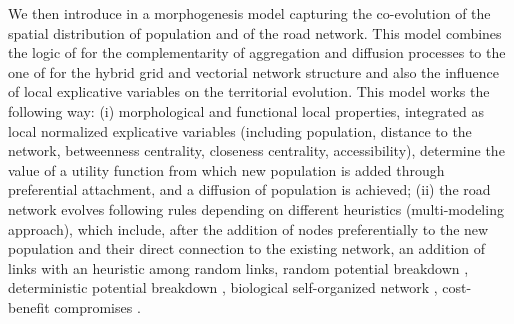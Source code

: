 \documentclass[11pt]{article}
\begin{document}
We then introduce in \cite{raimbault2018urban} a morphogenesis model capturing the co-evolution of the spatial distribution of population and of the road network. This model combines the logic of \cite{raimbault2018calibration} for the complementarity of aggregation and diffusion processes to the one of \cite{raimbault2014hybrid} for the hybrid grid and vectorial network structure and also the influence of local explicative variables on the territorial evolution. This model works the following way: (i) morphological and functional local properties, integrated as local normalized explicative variables (including population, distance to the network, betweenness centrality, closeness centrality, accessibility), determine the value of a utility function from which new population is added through preferential attachment, and a diffusion of population is achieved; (ii) the road network evolves following rules depending on different heuristics (multi-modeling approach), which include, after the addition of nodes preferentially to the new population and their direct connection to the existing network, an addition of links with an heuristic among random links, random potential breakdown \citep{schmitt2014modelisation}, deterministic potential breakdown \citep{raimbault2016generation}, biological self-organized network \citep{tero2010rules}, cost-benefit compromises \citep{louf2013emergence}.
\end{document}

